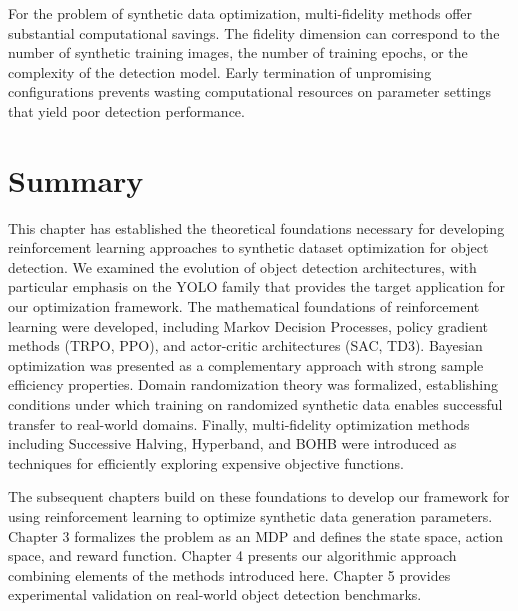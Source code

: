 For the problem of synthetic data optimization, multi-fidelity methods offer substantial computational savings. The fidelity dimension can correspond to the number of synthetic training images, the number of training epochs, or the complexity of the detection model. Early termination of unpromising configurations prevents wasting computational resources on parameter settings that yield poor detection performance.

\section{Summary}
\label{sec:background_summary}

This chapter has established the theoretical foundations necessary for developing reinforcement learning approaches to synthetic dataset optimization for object detection. We examined the evolution of object detection architectures, with particular emphasis on the YOLO family that provides the target application for our optimization framework. The mathematical foundations of reinforcement learning were developed, including Markov Decision Processes, policy gradient methods (TRPO, PPO), and actor-critic architectures (SAC, TD3). Bayesian optimization was presented as a complementary approach with strong sample efficiency properties. Domain randomization theory was formalized, establishing conditions under which training on randomized synthetic data enables successful transfer to real-world domains. Finally, multi-fidelity optimization methods including Successive Halving, Hyperband, and BOHB were introduced as techniques for efficiently exploring expensive objective functions.

The subsequent chapters build on these foundations to develop our framework for using reinforcement learning to optimize synthetic data generation parameters. Chapter 3 formalizes the problem as an MDP and defines the state space, action space, and reward function. Chapter 4 presents our algorithmic approach combining elements of the methods introduced here. Chapter 5 provides experimental validation on real-world object detection benchmarks.

